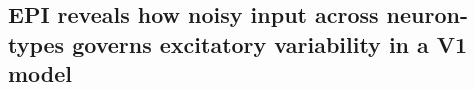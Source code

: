 \documentclass[11pt]{article}
\begin{document}
%

\subsection{EPI reveals how noisy input across neuron-types governs excitatory variability in a V1 model} \label{results_V1}
\end{document}
